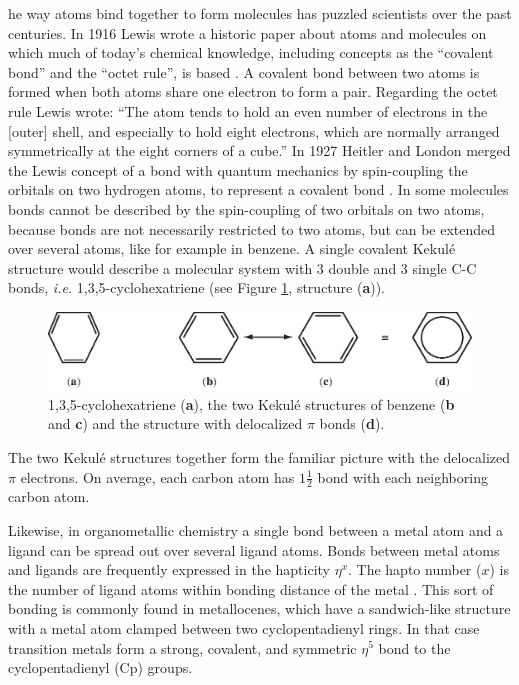 \lettrine{}{}he way atoms bind together to form molecules has puzzled scientists over the past centuries. In 1916 Lewis wrote a historic paper about atoms and molecules on which much of today's chemical knowledge, including concepts as the ``covalent bond'' and the ``octet rule'', is based \cite{lewis}. A covalent bond between two atoms is formed when both atoms share one electron to form a pair. Regarding the octet rule Lewis wrote: ``The atom tends to hold an even number of electrons in the [outer] shell, and especially to hold eight electrons, which are normally arranged symmetrically at the eight corners of a cube.'' In 1927 Heitler and London merged the Lewis concept of a bond with quantum mechanics  by spin-coupling the orbitals on two hydrogen atoms, to represent a covalent bond \cite{heitler}. In some molecules bonds cannot be described by the spin-coupling of two orbitals on two atoms, because bonds are not necessarily restricted to two atoms, but can be extended over several atoms, like for example in benzene. A single covalent Kekul\'{e} structure would describe a molecular system with 3 double and 3 single C-C bonds, \textit{i.e.} 1,3,5-cyclohexatriene (see Figure \ref{ch4.fig.cyclohexatriene}, structure (\textbf{a})).
\begin{figure}[hbtp]
\center
\includegraphics[scale=0.8]{cyclopentadienyl/figures/cyclohexatriene.eps}
\caption{1,3,5-cyclohexatriene (\textbf{a}), the two Kekul\'{e} structures of benzene (\textbf{b} and \textbf{c}) and the structure with delocalized $\pi$ bonds (\textbf{d}).}
\label{ch4.fig.cyclohexatriene}
\end{figure}
The two Kekul\'{e} structures together form the familiar picture with the delocalized $\pi$ electrons. On average, each carbon atom has $1\frac{1}{2}$ bond with each neighboring carbon atom.

Likewise, in organometallic chemistry a single bond between a metal atom and a ligand can be spread out over several ligand atoms. Bonds between metal atoms and ligands are frequently expressed in the hapticity $\eta^x$. The hapto number ($x$) is the number of ligand atoms within bonding distance of the metal \cite{powell}. This sort of bonding is commonly found in metallocenes, which have a sandwich-like structure with a metal atom clamped between two cyclopentadienyl rings. In that case transition metals form a strong, covalent, and symmetric $\eta^{5}$ bond to the cyclopentadienyl (Cp) groups.

